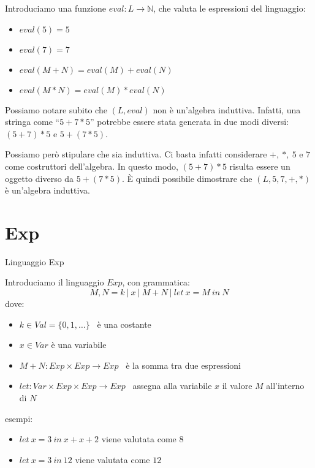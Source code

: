 \documentclass[a4paper,11pt]{report}
\begin{document}
Introduciamo una funzione \( eval : L \to \mathbb{N}\), che valuta le espressioni del linguaggio:
\begin{itemize}
    \item \(eval(5) = 5\)
    \item \( eval(7) = 7 \)
    \item \( eval(M+N) = eval(M)+eval(N)\)
    \item \( eval(M*N) = eval(M)*eval(N)\)
\end{itemize}

Possiamo notare subito che \( (L, eval) \) non è un'algebra induttiva. Infatti, una stringa come ``\( 5 + 7 * 5 \)'' potrebbe essere stata generata in due modi diversi: \( (5 + 7) * 5 \) e \( 5 + (7 * 5) \). 

Possiamo però stipulare che sia induttiva. Ci basta infatti considerare \( +, \ *, \ 5\) e \( 7 \) come costruttori dell'algebra. In questo modo, \( (5 + 7) * 5 \) risulta essere un oggetto diverso da \( 5 + (7 * 5) \). È quindi possibile dimostrare che \( (L, 5, 7, +, *) \) è un'algebra induttiva.

\section{Exp}

\begin{defbox}{Linguaggio Exp}{}

    Introduciamo il linguaggio \( Exp \), con grammatica:
    \[
        M, N = k \ | \ x \ | \ M + N \ | \ let \ x = M \ in \ N
    \]
    dove:

    \begin{itemize}
        \item \( k \in Val=\{0, 1, \dots\}\) \ è una costante
        \item \( x \in Var \) è una variabile     
        \item \( M + N : Exp \times Exp \to Exp \) \ è la somma tra due espressioni
        \item \(  let : Var \times Exp \times Exp \to Exp\) \ assegna alla variabile \( x \)
            il valore \( M \) all'interno di \( N \)
    \end{itemize}

\end{defbox}

\vspace{3em}
esempi:
\begin{itemize}
    \item \( let \ x = 3 \ in \ x+x+2 \) viene valutata come \( 8 \)
    \item \( let \ x = 3 \ in \ 12 \) viene valutata come \( 12 \)
\end{itemize}
\end{document}
